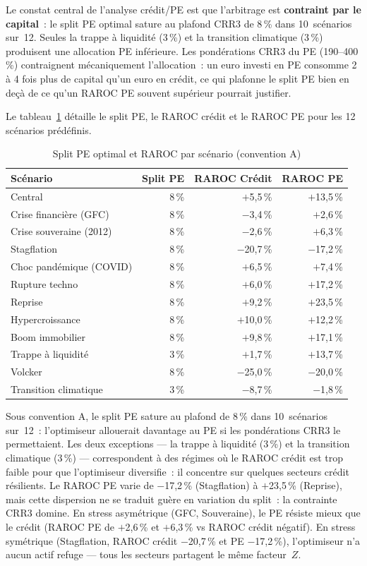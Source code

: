 \documentclass[10pt, a4paper, oneside]{report}
\theoremstyle{definition}
\begin{document}
Le constat central de l'analyse crédit/PE est que l'arbitrage est \textbf{contraint par le capital}~: le split PE optimal sature au plafond CRR3 de 8\,\% dans 10~scénarios sur~12. Seules la trappe à liquidité (3\,\%) et la transition climatique (3\,\%) produisent une allocation PE inférieure. Les pondérations CRR3 du PE (190--400\,\%) contraignent mécaniquement l'allocation~: un euro investi en PE consomme 2 à 4 fois plus de capital qu'un euro en crédit, ce qui plafonne le split PE bien en deçà de ce qu'un RAROC PE souvent supérieur pourrait justifier.

Le tableau~\ref{tab:split-pe} détaille le split PE, le RAROC crédit et le RAROC PE pour les 12 scénarios prédéfinis.

\begin{table}[htbp]
\centering
\caption{Split PE optimal et RAROC par scénario (convention A)}
\label{tab:split-pe}
\small
\begin{tabular}{lrrr}
\toprule
Scénario & Split PE & RAROC Crédit & RAROC PE \\
\midrule
Central & 8\,\% & $+$5{,}5\,\% & $+$13{,}5\,\% \\
Crise financière (GFC) & 8\,\% & $-$3{,}4\,\% & $+$2{,}6\,\% \\
Crise souveraine (2012) & 8\,\% & $-$2{,}6\,\% & $+$6{,}3\,\% \\
Stagflation & 8\,\% & $-$20{,}7\,\% & $-$17{,}2\,\% \\
Choc pandémique (COVID) & 8\,\% & $+$6{,}5\,\% & $+$7{,}4\,\% \\
Rupture techno & 8\,\% & $+$6{,}0\,\% & $+$17{,}2\,\% \\
Reprise & 8\,\% & $+$9{,}2\,\% & $+$23{,}5\,\% \\
Hypercroissance & 8\,\% & $+$10{,}0\,\% & $+$12{,}2\,\% \\
Boom immobilier & 8\,\% & $+$9{,}8\,\% & $+$17{,}1\,\% \\
Trappe à liquidité & 3\,\% & $+$1{,}7\,\% & $+$13{,}7\,\% \\
Volcker & 8\,\% & $-$25{,}0\,\% & $-$20{,}0\,\% \\
Transition climatique & 3\,\% & $-$8{,}7\,\% & $-$1{,}8\,\% \\
\bottomrule
\end{tabular}
\end{table}

Sous convention A, le split PE sature au plafond de 8\,\% dans 10~scénarios sur~12~: l'optimiseur allouerait davantage au PE si les pondérations CRR3 le permettaient. Les deux exceptions --- la trappe à liquidité (3\,\%) et la transition climatique (3\,\%) --- correspondent à des régimes où le RAROC crédit est trop faible pour que l'optimiseur diversifie~: il concentre sur quelques secteurs crédit résilients. Le RAROC PE varie de $-$17{,}2\,\% (Stagflation) à $+$23{,}5\,\% (Reprise), mais cette dispersion ne se traduit guère en variation du split~: la contrainte CRR3 domine. En stress asymétrique (GFC, Souveraine), le PE résiste mieux que le crédit (RAROC PE de $+$2{,}6\,\% et $+$6{,}3\,\% vs RAROC crédit négatif). En stress symétrique (Stagflation, RAROC crédit $-$20{,}7\,\% et PE $-$17{,}2\,\%), l'optimiseur n'a aucun actif refuge --- tous les secteurs partagent le même facteur~$Z$.
\end{document}

